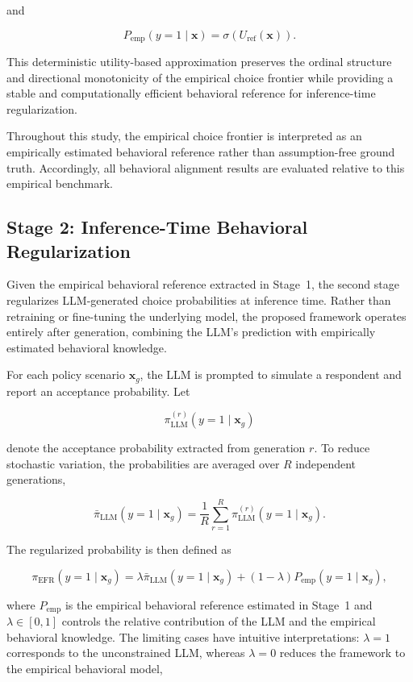 \documentclass[11pt]{article}
\begin{document}
and

\[
P_{\mathrm{emp}}(y=1\mid\mathbf{x})
=
\sigma\!\left(U_{\mathrm{ref}}(\mathbf{x})\right).
\]

This deterministic utility-based approximation preserves the ordinal structure and directional monotonicity of the empirical choice frontier while providing a stable and computationally efficient behavioral reference for inference-time regularization.

Throughout this study, the empirical choice frontier is interpreted as an empirically estimated behavioral reference rather than assumption-free ground truth. Accordingly, all behavioral alignment results are evaluated relative to this empirical benchmark.

\subsection{Stage 2: Inference-Time Behavioral Regularization}
\label{sec:stage2}

Given the empirical behavioral reference extracted in Stage~1, the second stage regularizes LLM-generated choice probabilities at inference time. Rather than retraining or fine-tuning the underlying model, the proposed framework operates entirely after generation, combining the LLM's prediction with empirically estimated behavioral knowledge.

For each policy scenario $\mathbf{x}_g$, the LLM is prompted to simulate a respondent and report an acceptance probability. Let

\[
\pi_{\mathrm{LLM}}^{(r)}(y=1\mid\mathbf{x}_g)
\]

denote the acceptance probability extracted from generation $r$. To reduce stochastic variation, the probabilities are averaged over $R$ independent generations,

\[
\bar{\pi}_{\mathrm{LLM}}(y=1\mid\mathbf{x}_g)
=
\frac{1}{R}
\sum_{r=1}^{R}
\pi_{\mathrm{LLM}}^{(r)}(y=1\mid\mathbf{x}_g).
\]

The regularized probability is then defined as

\[
\pi_{\mathrm{EFR}}(y=1\mid\mathbf{x}_g)
=
\lambda
\bar{\pi}_{\mathrm{LLM}}(y=1\mid\mathbf{x}_g)
+
(1-\lambda)
P_{\mathrm{emp}}(y=1\mid\mathbf{x}_g),
\label{eq:anchored_policy}
\]

where $P_{\mathrm{emp}}$ is the empirical behavioral reference estimated in Stage~1 and $\lambda\in[0,1]$ controls the relative contribution of the LLM and the empirical behavioral knowledge. The limiting cases have intuitive interpretations: $\lambda=1$ corresponds to the unconstrained LLM, whereas $\lambda=0$ reduces the framework to the empirical behavioral model,
\end{document}
